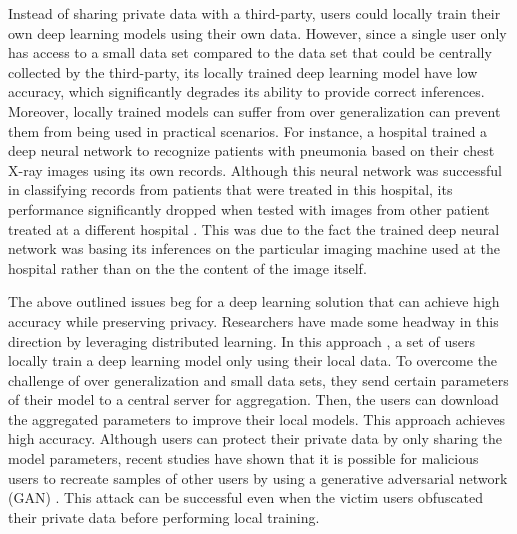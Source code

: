 \documentclass[conference]{IEEEtran}
\begin{document}
Instead of sharing private data with a third-party, users could locally train their own deep learning models using their own
data. However, since a single user only has access to a small data set compared to the data set that could be centrally
collected by the third-party, its locally trained deep learning model have low accuracy, which
significantly degrades its ability to provide correct inferences. 
Moreover, locally trained models can suffer from over generalization can prevent them from being used in practical scenarios.
For instance, a hospital trained a deep neural network to recognize patients with pneumonia based on their
chest X-ray images using its own records. Although this neural network was successful in classifying records from patients that were
treated in this hospital, its performance significantly dropped when tested with images from other patient treated at a different
hospital \cite{zech2018variable}. This was due to the fact the trained deep neural network was basing its inferences on the
particular imaging machine used at the hospital  rather than on the the content of the image itself.
 
The above outlined issues beg for a deep learning solution that can achieve high accuracy while preserving privacy. 
Researchers have made some headway in this direction by leveraging distributed learning.
In this approach  \cite{shokri2015privacy},  a set of users locally
train a deep learning model only using their local data. To overcome the challenge of over generalization and small
data sets, they send certain parameters of their model to a central server for aggregation. 
Then, the users can download the aggregated parameters to improve their local models. This approach achieves high accuracy.
Although users can protect their private data by only sharing the model parameters, recent studies have
shown that it is possible for malicious users to recreate samples of other users by using a generative
adversarial network (GAN) \cite{hitaj2017deep}. This attack can be successful even when the victim users 
obfuscated their private data before performing  local training. 
\end{document}
